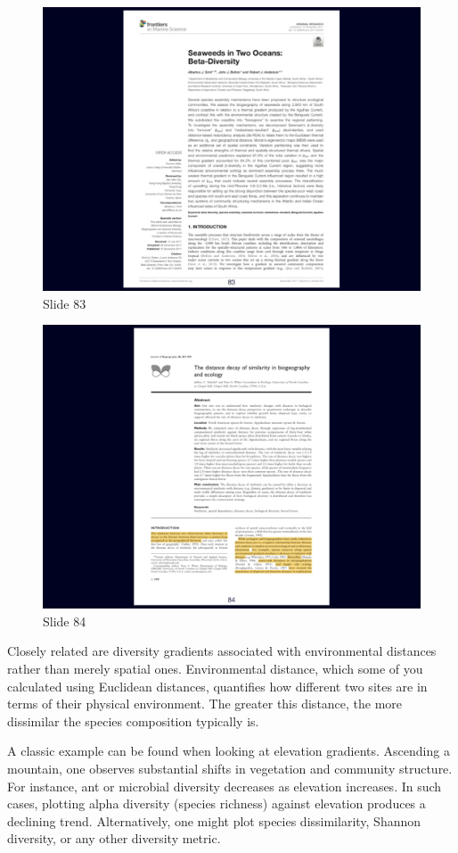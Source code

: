 \documentclass[
  10pt,
]{book}
\begin{document}
\begin{figure}[ht]
\centering
\includegraphics[width=0.8\linewidth]{../images/BDC334/BDC334-083.jpeg}
\caption*{Slide 83}
\end{figure}

\begin{figure}[ht]
\centering
\includegraphics[width=0.8\linewidth]{../images/BDC334/BDC334-084.jpeg}
\caption*{Slide 84}
\end{figure}

Closely related are diversity gradients associated with environmental
distances rather than merely spatial ones. Environmental distance, which
some of you calculated using Euclidean distances, quantifies how
different two sites are in terms of their physical environment. The
greater this distance, the more dissimilar the species composition
typically is.

A classic example can be found when looking at elevation gradients.
Ascending a mountain, one observes substantial shifts in vegetation and
community structure. For instance, ant or microbial diversity decreases
as elevation increases. In such cases, plotting alpha diversity (species
richness) against elevation produces a declining trend. Alternatively,
one might plot species dissimilarity, Shannon diversity, or any other
diversity metric.
\end{document}
